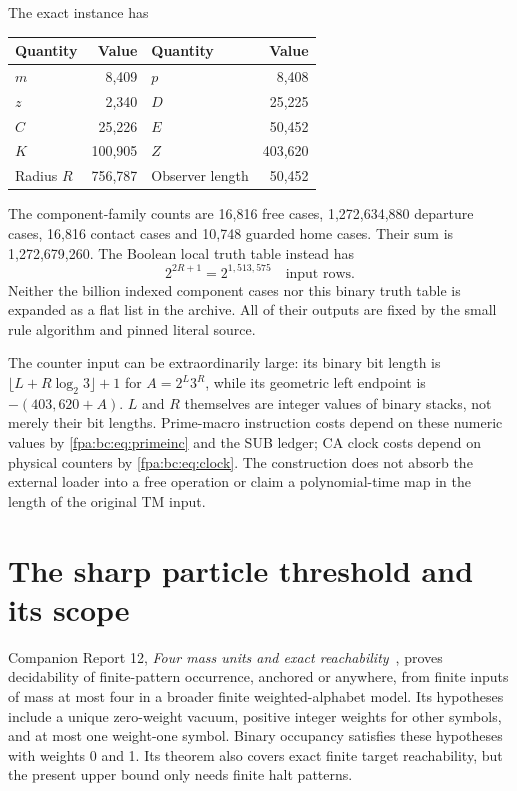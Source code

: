 \documentclass[11pt,a4paper]{article}
\numberwithin{equation}{section}
\begin{document}
The exact instance has
\begin{center}
\begin{tabular}{lr@{\qquad}lr}
\toprule
Quantity&Value&Quantity&Value\\
\midrule
$m$&8,409&$p$&8,408\\
$z$&2,340&$D$&25,225\\
$C$&25,226&$E$&50,452\\
$K$&100,905&$Z$&403,620\\
Radius $R$&756,787&Observer length&50,452\\
\bottomrule
\end{tabular}
\end{center}
The component-family counts are 16,816 free cases, 1,272,634,880 departure
cases, 16,816 contact cases and 10,748 guarded home cases. Their sum is
1,272,679,260. The Boolean local truth table instead has
\begin{equation}
 2^{2R+1}=2^{1,513,575}\quad\text{input rows}.\label{fpa:bc:eq:universaltruth}
\end{equation}
Neither the billion indexed component cases nor this binary truth table is
expanded as a flat list in the archive. All of their outputs are fixed by the
small rule algorithm and pinned literal source.

The counter input can be extraordinarily large: its binary bit length is
$\lfloor L+R\log_2 3\rfloor+1$ for $A=2^L3^R$, while its geometric left
endpoint is $-(403,620+A)$. $L$ and $R$ themselves are integer values of binary
stacks, not merely their bit lengths. Prime-macro instruction costs depend on
these numeric values by \eqref{fpa:bc:eq:primeinc} and the SUB ledger; CA clock costs
depend on physical counters by \eqref{fpa:bc:eq:clock}. The construction does not
absorb the external loader into a free operation or claim a polynomial-time
map in the length of the original TM input.

\section{The sharp particle threshold and its scope}\label{fpa:bc:sec:lower}
Companion Report 12, \emph{Four mass units and exact reachability}~\cite{fpa:report12},
proves decidability of finite-pattern occurrence, anchored or anywhere, from
finite inputs of mass at most four in a broader finite weighted-alphabet model.
Its hypotheses include a unique zero-weight vacuum, positive integer weights
for other symbols, and at most one weight-one symbol. Binary occupancy satisfies
these hypotheses with weights 0 and 1. Its theorem also covers exact finite
target reachability, but the present upper bound only needs finite halt patterns.
\end{document}
